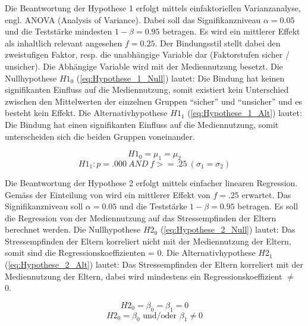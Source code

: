Die Beantwortung der Hypothese 1 erfolgt mittels einfaktoriellen Varianzanalyse, engl. ANOVA (Analysis of Variance). Dabei soll das Signifikanzniveau $\alpha=0.05$ und die Teststärke mindesten $1-\beta=0.95$ betragen. Es wird ein mittlerer Effekt \cite{Cohen1988a} als inhaltlich relevant angesehen $f = 0.25$. Der Bindungsstil stellt dabei den zweistufigen Faktor, resp. die unabhängige Variable dar (Faktorstufen sicher / unsicher). Die Abhängige Variable wird mit der Mediennutzung besetzt. Die Nullhypothese $H1_{0}$ (\ref{eq:Hypothese_1_Null}) lautet: Die Bindung hat keinen signifikanten Einfluss auf die Mediennutzung, somit existiert kein Unterschied zwischen den Mittelwerten der einzelnen Gruppen \enquote{sicher} und \enquote{unsicher} und es besteht kein Effekt. Die Alternativhypothese $H1_{1}$ (\ref{eq:Hypothese_1_Alt})  lautet: Die Bindung hat einen signifikanten Einfluss auf die Mediennutzung, somit unterscheiden sich die beiden Gruppen voneinander.

\begin{equation}\label{eq:Hypothese_1_Null}
    H1_{0} = \mu_1 = \mu_2
\end{equation}
\begin{equation}\label{eq:Hypothese_1_Alt}
    H1_{1}:p=.000 ~ AND ~ f>=.25~ (\sigma_1 = \sigma_2)
\end{equation}

Die Beantwortung der Hypothese 2 erfolgt mittels einfacher linearen Regression. Gemäss der Einteilung von  wird ein mittlerer Effekt von $f=.25$ erwartet. Das Signifikanzniveau soll $\alpha=0.05$ und die Teststärke $1-\beta=0.95$ betragen. Es soll die Regression von der Mediennutzung auf das Stressempfinden der Eltern berechnet werden. Die Nullhypothese $H2_{0}$ (\ref{eq:Hypothese_2_Null}) lautet: Das Stressempfinden der Eltern korreliert nicht  mit der Mediennutzung der Eltern, somit sind die Regressionskoeffizienten = 0. Die Alternativhypothese $H2_{1}$ (\ref{eq:Hypothese_2_Alt}) lautet: Das Stressempfinden der Eltern korreliert mit der Mediennutzung der Eltern, dabei wird mindestens ein Regressionskoeffizient $\neq$ 0.

\begin{equation}\label{eq:Hypothese_2_Null}
    H2_{0}=\beta_0 = \beta_1 = 0
\end{equation}
\begin{equation}\label{eq:Hypothese_2_Alt}
    H2_{0}=\beta_0 \text{ und/oder } \beta_1 \neq 0
\end{equation}

